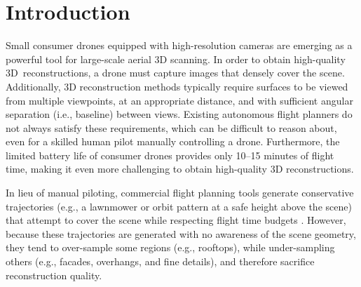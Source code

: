 \section{Introduction}

Small consumer drones equipped with high-resolution cameras are emerging as a powerful tool for large-scale aerial 3D scanning.
In order to obtain high-quality 3D\ reconstructions, a drone must capture images that densely cover the scene.
Additionally, 3D reconstruction methods typically require surfaces to be viewed from multiple viewpoints, at an appropriate distance, and with sufficient angular separation (i.e., baseline) between views.
Existing autonomous flight planners do not always satisfy these  requirements, which can be difficult to reason about, even for a skilled human pilot manually controlling a drone.
Furthermore, the limited battery life of consumer drones provides only 10--15 minutes of flight time, making it even more challenging to obtain high-quality 3D reconstructions.


In lieu of manual piloting, commercial flight planning tools generate conservative trajectories (e.g., a lawnmower or orbit pattern at a safe height above the scene) that attempt to cover the scene while respecting flight time budgets \cite{3dr:2017a,pix4d:2017a}.
However, because these trajectories are generated with no awareness of the scene geometry, they tend to over-sample some regions (e.g., rooftops), while under-sampling others (e.g., facades, overhangs, and fine details), and therefore sacrifice reconstruction quality.

